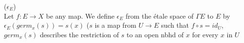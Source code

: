 \begin{definition*}
	($\epsilon_E$)\\ Let $f: E \rightarrow X$ be any map. We define $\epsilon_E$ from the \'etale space of $\Gamma E$ to $E$ by $\epsilon_E(germ_x(s)) = s(x)$ ($s$ is a map from $U \rightarrow E$ such that $f \circ s = id_U$, $germ_x(s)$ describes the restriction of $s$ to an open nbhd of $x$ for every $x$ in $U$
\end{definition*}